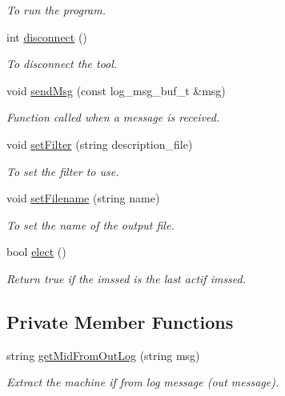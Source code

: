 \begin{DoxyCompactItemize}
\begin{DoxyCompactList}\small\item\em To run the program. \item\end{DoxyCompactList}\item 
int \hyperlink{classIMSVishnuTool_a34b473a40f14f34e5fe75ff9c1dfd4b3}{disconnect} ()
\begin{DoxyCompactList}\small\item\em To disconnect the tool. \item\end{DoxyCompactList}\item 
void \hyperlink{classIMSVishnuTool_a091fff6fed4eed02270497f66131a094}{sendMsg} (const log\_\-msg\_\-buf\_\-t \&msg)
\begin{DoxyCompactList}\small\item\em Function called when a message is received. \item\end{DoxyCompactList}\item 
void \hyperlink{classIMSVishnuTool_a0fdec4505183f4fc8308f1f3e2afce5f}{setFilter} (string description\_\-file)
\begin{DoxyCompactList}\small\item\em To set the filter to use. \item\end{DoxyCompactList}\item 
void \hyperlink{classIMSVishnuTool_ab44fc6ad246e4c82a513c4f08bf74960}{setFilename} (string name)
\begin{DoxyCompactList}\small\item\em To set the name of the output file. \item\end{DoxyCompactList}\item 
bool \hyperlink{classIMSVishnuTool_aeb84a7b24348bdd9c7208989966404ed}{elect} ()
\begin{DoxyCompactList}\small\item\em Return true if the imssed is the last actif imssed. \item\end{DoxyCompactList}\end{DoxyCompactItemize}
\subsection*{Private Member Functions}
\begin{DoxyCompactItemize}
\item 
string \hyperlink{classIMSVishnuTool_aa703880867b1ac81c53dc59e8599d6fa}{getMidFromOutLog} (string msg)
\begin{DoxyCompactList}\small\item\em Extract the machine if from log message (out message). \item\end{DoxyCompactList}\end{DoxyCompactItemize}

